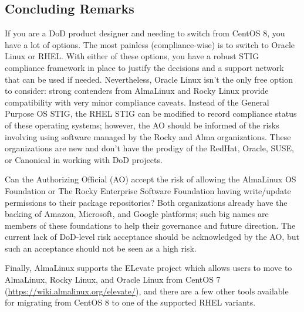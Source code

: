 \subsection{Concluding Remarks}

If you are a DoD product designer and needing to switch from CentOS 8, you have a lot of options. The most painless (compliance-wise) is to switch to Oracle Linux or RHEL. With either of these options, you have a robust STIG compliance framework in place to justify the decisions and a support network that can be used if needed. Nevertheless, Oracle Linux isn't the only free option to consider: strong contenders from AlmaLinux and Rocky Linux provide compatibility with very minor compliance caveats. Instead of the General Purpose OS STIG, the RHEL STIG can be modified to record compliance status of these operating systems; however, the AO should be informed of the risks involving using software managed by the Rocky and Alma organizations. These organizations are new and don't have the prodigy of the RedHat, Oracle, SUSE, or Canonical in working with DoD projects.

Can the Authorizing Official (AO) accept the risk of allowing the AlmaLinux OS Foundation or The Rocky Enterprise Software Foundation having write/update permissions to their package repositories? Both organizations already have the backing of Amazon, Microsoft, and Google platforms; such big names are members of these foundations to help their governance and future direction. The current lack of DoD-level risk acceptance should be acknowledged by the AO, but such an acceptance should not be seen as a high risk.

Finally, AlmaLinux supports the ELevate project which allows users to move to AlmaLinux, Rocky Linux, and Oracle Linux from CentOS 7 (\url{https://wiki.almalinux.org/elevate/}), and there are a few other tools available for migrating from CentOS 8 to one of the supported RHEL variants.
